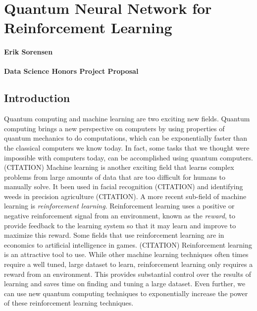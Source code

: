\documentclass[]{article}
\date{}
\let\oldparagraph\paragraph
\renewcommand{\paragraph}[1]{\oldparagraph{#1}\mbox{}}
\begin{document}
\section{Quantum Neural Network for Reinforcement
Learning}\label{quantum-neural-network-for-reinforcement-learning}

\paragraph{Erik Sorensen}\label{erik-sorensen}

\paragraph{Data Science Honors Project
Proposal}\label{data-science-honors-project-proposal}

\subsection{Introduction}\label{introduction}

Quantum computing and machine learning are two exciting new fields.
Quantum computing brings a new perspective on computers by using
properties of quantum mechanics to do computations, which can be
exponentially faster than the classical computers we know today. In
fact, some tasks that we thought were impossible with computers today,
can be accomplished using quantum computers. (CITATION) Machine learning
is another exciting field that learns complex problems from large
amounts of data that are too difficult for humans to manually solve. It
been used in facial recognition (CITATION) and identifying weeds in
precision agriculture (CITATION). A more recent sub-field of machine
learning is \emph{reinforcement learning}. Reinforcement learning uses a
positive or negative reinforcement signal from an environment, known as
the \emph{reward}, to provide feedback to the learning system so that it
may learn and improve to maximize this reward. Some fields that use
reinforcement learning are in economics to artificial intelligence in
games. (CITATION) Reinforcement learning is an attractive tool to use.
While other machine learning techniques often times require a well
tuned, large dataset to learn, reinforcement learning only requires a
reward from an environment. This provides substantial control over the
results of learning and saves time on finding and tuning a large
dataset. Even further, we can use new quantum computing techniques to
exponentially increase the power of these reinforcement learning
techniques.
\end{document}
